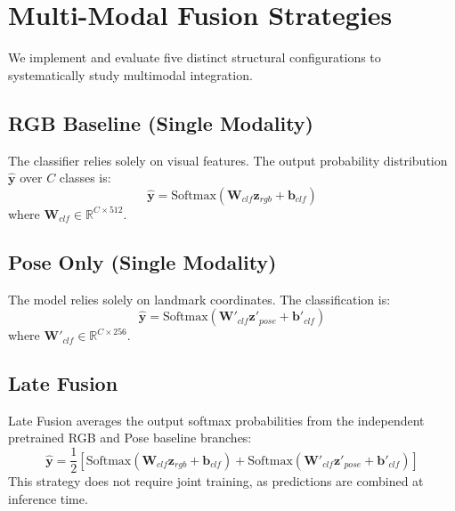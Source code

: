 \documentclass[conference]{IEEEtran}
\begin{document}
\section{Multi-Modal Fusion Strategies}
We implement and evaluate five distinct structural configurations to systematically study multimodal integration.

\subsection{RGB Baseline (Single Modality)}
The classifier relies solely on visual features. The output probability distribution $\hat{\mathbf{y}}$ over $C$ classes is:
\begin{equation}
    \hat{\mathbf{y}} = \text{Softmax}(\mathbf{W}_{clf} \mathbf{z}_{rgb} + \mathbf{b}_{clf})
\end{equation}
where $\mathbf{W}_{clf} \in \mathbb{R}^{C \times 512}$.

\subsection{Pose Only (Single Modality)}
The model relies solely on landmark coordinates. The classification is:
\begin{equation}
    \hat{\mathbf{y}} = \text{Softmax}(\mathbf{W}'_{clf} \mathbf{z}'_{pose} + \mathbf{b}'_{clf})
\end{equation}
where $\mathbf{W}'_{clf} \in \mathbb{R}^{C \times 256}$.

\subsection{Late Fusion}
Late Fusion averages the output softmax probabilities from the independent pretrained RGB and Pose baseline branches:
\begin{equation}
    \hat{\mathbf{y}} = \frac{1}{2} \left[ \text{Softmax}(\mathbf{W}_{clf} \mathbf{z}_{rgb} + \mathbf{b}_{clf}) + \text{Softmax}(\mathbf{W}'_{clf} \mathbf{z}'_{pose} + \mathbf{b}'_{clf}) \right]
\end{equation}
This strategy does not require joint training, as predictions are combined at inference time.
\end{document}
